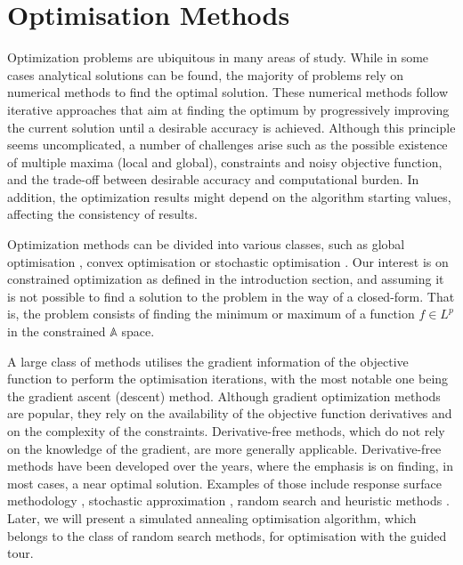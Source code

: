\hypertarget{optim}{%
\section{Optimisation Methods}\label{optim}}

Optimization problems are ubiquitous in many areas of study. While in
some cases analytical solutions can be found, the majority of problems
rely on numerical methods to find the optimal solution. These numerical
methods follow iterative approaches that aim at finding the optimum by
progressively improving the current solution until a desirable accuracy
is achieved. Although this principle seems uncomplicated, a number of
challenges arise such as the possible existence of multiple maxima
(local and global), constraints and noisy objective function, and the
trade-off between desirable accuracy and computational burden. In
addition, the optimization results might depend on the algorithm
starting values, affecting the consistency of results.

Optimization methods can be divided into various classes, such as global
optimisation \citep{kelley1999iterative, fletcher2013practical}, convex
optimisation \citep{boyd2004convex} or stochastic optimisation
\citep{nocedal2006numerical}. Our interest is on constrained
optimization \citep{bertsekas2014constrained} as defined in the
introduction section, and assuming it is not possible to find a solution
to the problem in the way of a closed-form. That is, the problem
consists of finding the minimum or maximum of a function \(f \in L^p\)
in the constrained \(\mathbb{A}\) space.

A large class of methods utilises the gradient information of the
objective function to perform the optimisation iterations, with the most
notable one being the gradient ascent (descent) method. Although
gradient optimization methods are popular, they rely on the availability
of the objective function derivatives and on the complexity of the
constraints. Derivative-free methods, which do not rely on the knowledge
of the gradient, are more generally applicable. Derivative-free methods
have been developed over the years, where the emphasis is on finding, in
most cases, a near optimal solution. Examples of those include response
surface methodology \citep{box1951experimental}, stochastic
approximation \citep{robbins1951stochastic}, random search
\citep{fu2015handbook} and heuristic methods
\citep{sorensen2013metaheuristics}. Later, we will present a simulated
annealing optimisation algorithm, which belongs to the class of random
search methods, for optimisation with the guided tour.

